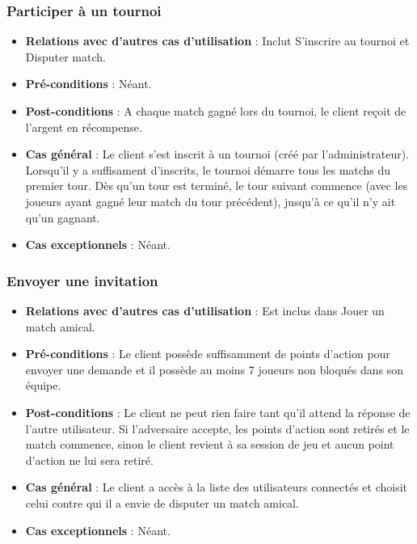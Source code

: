\documentclass[a4paper,titlepage]{scrreprt}
\begin{document}
    \subsubsection{Participer à un tournoi}
      \begin{itemize}
        \item \textbf{Relations avec d'autres cas d'utilisation}  : Inclut S'inscrire au tournoi et Disputer match.
        \item \textbf{Pré-conditions} : Néant.
        \item \textbf{Post-conditions} : A chaque match gagné lors du tournoi, le client reçoit de l'argent en récompense.
        \item \textbf{Cas général} : Le client s'est inscrit à un tournoi (créé par l'administrateur). Lorsqu'il y a suffisament d'inscrits, le tournoi démarre tous les matchs du premier tour. Dès qu'un tour est terminé, le tour suivant
        commence (avec les joueurs ayant gagné leur match du tour précédent), jusqu'à ce qu'il n'y ait qu'un gagnant.
        \item \textbf{Cas exceptionnels} : Néant.
      \end{itemize}

    \subsubsection{Envoyer une invitation}
      \begin{itemize}
        \item \textbf{Relations avec d'autres cas d'utilisation}  : Est inclus dans Jouer un match amical.
        \item \textbf{Pré-conditions} : Le client possède suffisamment de points d'action pour envoyer une demande et il possède au moins 7 joueurs non bloqués dans son équipe.
        \item \textbf{Post-conditions} : Le client ne peut rien faire tant qu'il attend la réponse de l'autre utilisateur. Si l'adversaire accepte, les points d'action sont retirés et le match commence, sinon le client revient à sa session de jeu et aucun point d'action ne lui sera retiré.
        \item \textbf{Cas général} : Le client a accès à la liste des utilisateurs connectés et choisit celui contre qui il a envie de disputer un match amical.
        \item \textbf{Cas exceptionnels} : Néant.
      \end{itemize}
\end{document}
